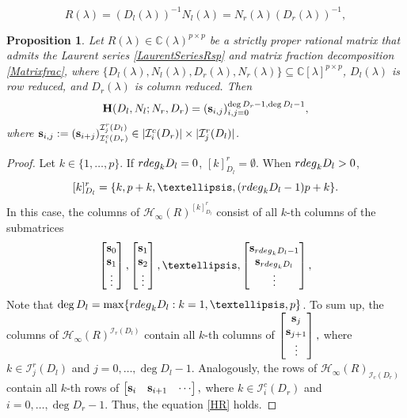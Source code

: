 \documentclass[10pt,a4paper]{amsart}
\newtheorem{proposition}{Proposition}
\begin{document}
\begin{equation}\label{Matrixfrac}
R(\lambda)=(D_l(\lambda))^{-1}N_l(\lambda)=N_r(\lambda)(D_r(\lambda))^{-1},
\end{equation}

\begin{proposition}\label{LemHs}
Let $R(\lambda)\in \mathbb C(\lambda)^{p\times p}$ be a strictly proper rational matrix that admits the Laurent series \eqref{LaurentSeriesRsp} and matrix fraction decomposition \eqref{Matrixfrac}, where $\{D_l(\lambda), N_l(\lambda),D_r(\lambda), N_r(\lambda)\}\subseteq \mathbb C[\lambda]^{p\times p}$, $D_l(\lambda)$ is row reduced, and $D_r(\lambda)$ is column reduced.
Then \begin{equation}\label{HR}
\mathbf{H}(D_l,N_l;N_r,D_r)=({\bf  s}_{i,j})_{i,j=0}^{\deg D_r-1,\deg D_l-1},
\end{equation}
where ${\bf  s}_{i,j}:=\left({\bf s}_{i+j}\right)_{\mathcal I^c_i(D_r)}^{\mathcal I^r_j(D_l)}\in |\mathcal I^c_i(D_r)|\times |\mathcal I^r_j(D_l)|$.

\end{proposition} 

\begin{proof} Let $k\in \{1,\ldots,p\}$. If ${\rm rdeg}_kD_l=0$,  $[k]^r_{D_l}=\emptyset$. When ${\rm rdeg}_kD_l>0$,  $$[k]^r_{D_l}=\{k,p+k,\ldots,({\rm rdeg}_kD_l-1)p+k\}.$$ In this case,
the columns of $\mathscr{H}_{\infty}( R)^{[k]^r_{D_l}}$ consist of all $k$-th columns of the submatrices 
\begin{equation*}
\begin{bmatrix}
{\bf s}_{0}\\
{\bf s}_{1}\\
\vdots
\end{bmatrix},\begin{bmatrix}
{\bf s}_{1}\\
{\bf s}_{2}\\
\vdots
\end{bmatrix},\ldots,\begin{bmatrix}
{\bf s}_{{\rm rdeg}_kD_l-1}\\
{\bf s}_{{\rm rdeg}_kD_l}\\
\vdots
\end{bmatrix},
\end{equation*}
Note that $\deg D_l=\max \{{\rm rdeg}_kD_l:k=1,\ldots,p\}$.
To sum up, the columns of $\mathscr{H}_{\infty}(R)^{\mathcal I_r(D_l)}$ contain all $k$-th columns of 
$
\begin{bmatrix}
{\bf s}_{j}\\
{\bf s}_{j+1}\\
\vdots
\end{bmatrix},
$
where $k\in \mathcal I^r_j(D_l)$ and $j=0,\ldots,\deg D_l-1$. Analogously, the rows of $\mathscr{H}_{\infty}(R)_{\mathcal I_c(D_r)}$ contain all $k$-th rows of 
$
\begin{bmatrix}
{\bf s}_{i} &
{\bf s}_{i+1} &\cdots
\end{bmatrix},
$
where $k\in \mathcal I^c_i(D_r)$ and $i=0,\ldots,\deg D_r-1$. Thus, the equation \eqref{HR} holds.

\end{proof}
\end{document}
